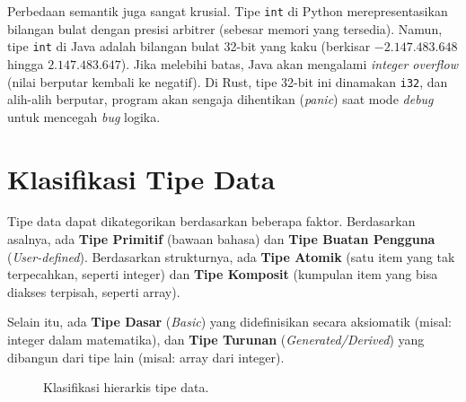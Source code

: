 \documentclass[11pt,a4paper]{article}
\begin{document}
	Perbedaan semantik juga sangat krusial. Tipe \texttt{int} di Python merepresentasikan bilangan bulat dengan presisi arbitrer (sebesar memori yang tersedia). Namun, tipe \texttt{int} di Java adalah bilangan bulat 32-bit yang kaku (berkisar $-2.147.483.648$ hingga $2.147.483.647$). Jika melebihi batas, Java akan mengalami \textit{integer overflow} (nilai berputar kembali ke negatif). Di Rust, tipe 32-bit ini dinamakan \texttt{i32}, dan alih-alih berputar, program akan sengaja dihentikan (\textit{panic}) saat mode \textit{debug} untuk mencegah \textit{bug} logika.
	
	\section{Klasifikasi Tipe Data}
	
	Tipe data dapat dikategorikan berdasarkan beberapa faktor. Berdasarkan asalnya, ada \textbf{Tipe Primitif} (bawaan bahasa) dan \textbf{Tipe Buatan Pengguna} (\textit{User-defined}). Berdasarkan strukturnya, ada \textbf{Tipe Atomik} (satu item yang tak terpecahkan, seperti integer) dan \textbf{Tipe Komposit} (kumpulan item yang bisa diakses terpisah, seperti array). 
	
	Selain itu, ada \textbf{Tipe Dasar} (\textit{Basic}) yang didefinisikan secara aksiomatik (misal: integer dalam matematika), dan \textbf{Tipe Turunan} (\textit{Generated/Derived}) yang dibangun dari tipe lain (misal: array dari integer). 
	
	\begin{figure}[H]
		\centering
		\caption{Klasifikasi hierarkis tipe data.}
		\label{fig:hierarchy-types}
	\end{figure}
	
\end{document}
